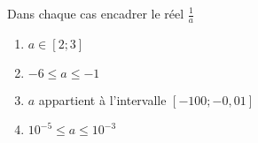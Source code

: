 
Dans chaque cas encadrer le réel $\frac{1}{a}$
\begin{enumerate}
\item $a \in [2;3]$
\item $-6 \leq a \leq -1$
\item $a$ appartient à l'intervalle $[-100;-0,01]$
\item $10^{-5} \leq a \leq 10^{-3}$
\end{enumerate}